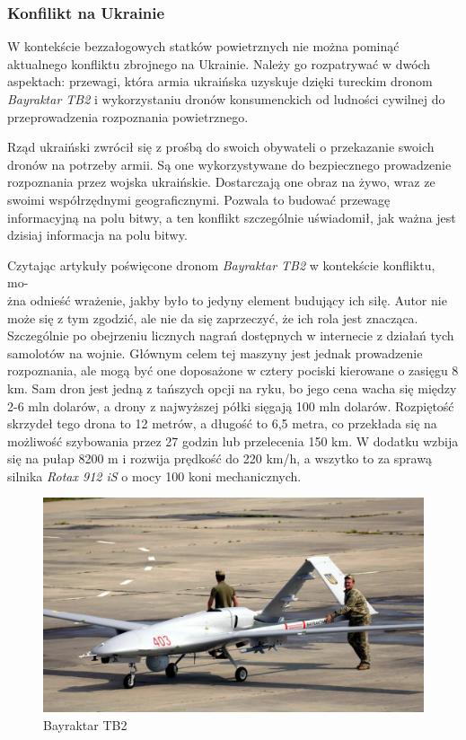 \subsubsection{Konfilikt na Ukrainie}
W kontekście bezzałogowych statków powietrznych nie można pominąć aktualnego konfliktu zbrojnego na Ukrainie. Należy go rozpatrywać w dwóch aspektach: przewagi, która armia ukraińska uzyskuje dzięki tureckim dronom \textit{Bayraktar TB2} i wykorzystaniu dronów konsumenckich od ludności cywilnej do przeprowadzenia rozpoznania powietrznego.

Rząd ukraiński zwrócił się z prośbą do swoich obywateli o przekazanie swoich dronów na potrzeby armii. Są one wykorzystywane do bezpiecznego prowadzenie rozpoznania przez wojska ukraińskie. Dostarczają one obraz na żywo, wraz ze swoimi współrzędnymi geograficznymi. Pozwala to budować przewagę informacyjną na polu bitwy, a ten konflikt szczególnie uświadomił, jak ważna jest dzisiaj informacja na polu bitwy.\cite{fotografia-drony-ukraina}

Czytając artykuły poświęcone dronom \textit{Bayraktar TB2} w kontekście konfliktu, mo-\\żna odnieść wrażenie, jakby było to jedyny element budujący ich siłę. Autor nie może się z tym zgodzić, ale nie da się zaprzeczyć, że ich rola jest znacząca. Szczególnie po obejrzeniu licznych nagrań dostępnych w internecie z działań tych samolotów na wojnie. Głównym celem tej maszyny jest jednak prowadzenie rozpoznania, ale mogą być one doposażone w cztery pociski kierowane o zasięgu 8 km. Sam dron jest jedną z tańszych opcji na ryku, bo jego cena wacha się między 2-6 mln dolarów, a drony z najwyższej półki sięgają 100 mln dolarów. Rozpiętość skrzydeł tego drona to 12 metrów, a długość to 6,5 metra, co przekłada się na możliwość szybowania przez 27 godzin lub przelecenia 150 km. W dodatku wzbija się na pułap 8200 m i rozwija prędkość do 220 km/h, a wszytko to za sprawą silnika \textit{Rotax 912 iS} o mocy 100 koni mechanicznych.\cite{bayraktar-chip}\cite{bayraktar-pap}

\begin{figure}[!ht]
  \centering
  \includegraphics[width=12cm]{./Obrazy/Bayraktar_TB2_ukraina.jpg}
  \caption{Bayraktar TB2}
  \end{figure}


